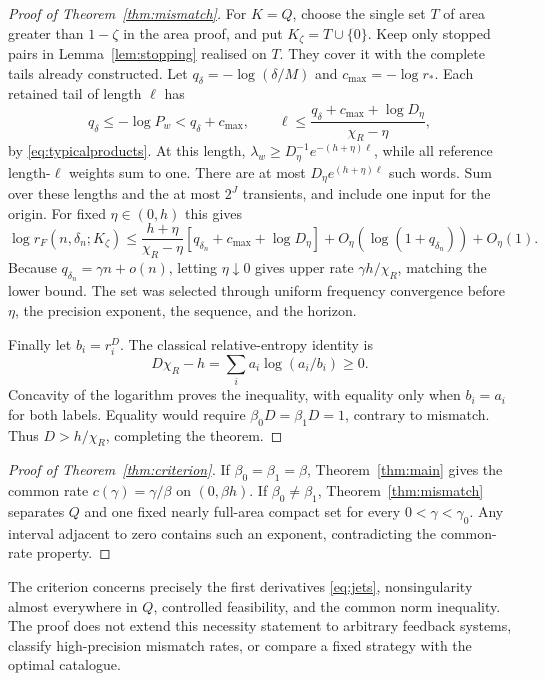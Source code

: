\documentclass[11pt]{amsart}
\theoremstyle{definition}
\theoremstyle{remark}
\numberwithin{equation}{section}
\begin{document}
\begin{proof}[Proof of Theorem~\ref{thm:mismatch}]
For $K=Q$, choose the single set $T$ of area greater than $1-\zeta$
in the area proof, and put $K_\zeta=T\cup\{0\}$.
Keep only stopped pairs in Lemma~\ref{lem:stopping} realised on $T$.
They cover it with the complete tails already constructed.
Let $q_\delta=-\log(\delta/M)$ and $c_{\max}=-\log r_*$.
Each retained tail of length $\ell$ has
\[
q_\delta\le-\log P_w<q_\delta+c_{\max},\qquad
\ell\le\frac{q_\delta+c_{\max}+\log D_{\eta}}{\chi_R-\eta},
\]
by \eqref{eq:typicalproducts}. At this length,
$\lambda_w\ge D_{\eta}^{-1}e^{-(h+\eta)\ell}$, while all reference
length-$\ell$ weights sum to one. There are at most
$D_{\eta}e^{(h+\eta)\ell}$ such words. Sum over these lengths and the
at most $2^J$ transients, and include one input for the origin.
For fixed $\eta\in(0,h)$ this gives
\begin{equation}\label{eq:typicalstop}
\log r_F(n,\delta_n;K_\zeta)
\le\frac{h+\eta}{\chi_R-\eta}
[q_{\delta_n}+c_{\max}+\log D_{\eta}]
+O_{\eta}(\log(1+q_{\delta_n}))+O_{\eta}(1).
\end{equation}
Because $q_{\delta_n}=\gamma n+o(n)$, letting $\eta\downarrow0$
gives upper rate $\gamma h/\chi_R$, matching the lower bound.
The set was selected through uniform frequency convergence before
$\eta$, the precision exponent, the sequence, and the horizon.

Finally let $b_i=r_i^D$. The classical relative-entropy identity is
\[
D\chi_R-h=\sum_i a_i\log(a_i/b_i)\ge0.
\]
Concavity of the logarithm proves the inequality, with equality
only when $b_i=a_i$ for both labels. Equality would require
$\beta_0D=\beta_1D=1$, contrary to mismatch.
Thus $D>h/\chi_R$, completing the theorem.
\end{proof}

\begin{proof}[Proof of Theorem~\ref{thm:criterion}]
If $\beta_0=\beta_1=\beta$, Theorem~\ref{thm:main} gives
the common rate $c(\gamma)=\gamma/\beta$ on $(0,\beta h)$.
If $\beta_0\ne\beta_1$, Theorem~\ref{thm:mismatch} separates
$Q$ and one fixed nearly full-area compact set for every
$0<\gamma<\gamma_0$. Any interval adjacent to zero contains
such an exponent, contradicting the common-rate property.
\end{proof}

The criterion concerns precisely the first derivatives
\eqref{eq:jets}, nonsingularity almost everywhere in $Q$,
controlled feasibility, and the common norm inequality. The proof does not extend this
necessity statement to arbitrary feedback systems, classify
high-precision mismatch rates, or compare a fixed strategy with
the optimal catalogue.
\end{document}
